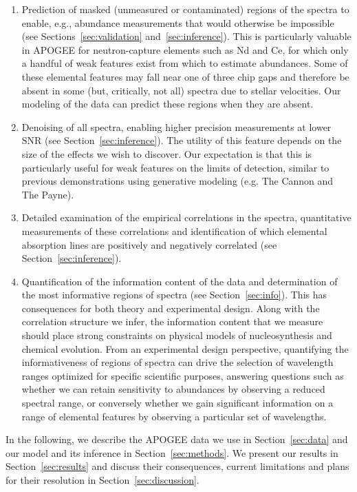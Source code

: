 \documentclass[a4paper,fleqn,usenatbib]{mnras}
\begin{document}
\begin{enumerate}
\item Prediction of masked (unmeasured or contaminated) regions of the spectra to enable, e.g., abundance measurements that would otherwise be impossible (see Sections~\ref{sec:validation} and~\ref{sec:inference}). This is particularly valuable in APOGEE for neutron-capture elements such as Nd and Ce, for which only a handful of weak features exist from which to estimate abundances. Some of these elemental features may fall near one of three chip gaps and therefore be absent in some (but, critically, not all) spectra due to stellar velocities. Our modeling of the data can predict these regions when they are absent. 
\item Denoising of all spectra, enabling higher precision measurements at lower SNR (see Section~\ref{sec:inference}). The utility of this feature depends on the size of the effects we wish to discover. Our expectation is that this is particularly useful for weak features on the limits of detection, similar to previous demonstrations using generative modeling (e.g. The Cannon and The Payne).
\item Detailed examination of the empirical correlations in the spectra, quantitative measurements of these correlations and identification of which elemental absorption lines are positively and negatively correlated (see Section~\ref{sec:inference}).
\item Quantification of the information content of the data and determination of the most informative regions of spectra (see Section~\ref{sec:info}). This has consequences for both theory and experimental design. Along with the correlation structure we infer, the information content that we measure should place strong constraints on physical models of nucleosynthesis and chemical evolution. From an experimental design perspective, quantifying the informativeness of regions of spectra can drive the selection of wavelength ranges optimized for specific scientific purposes, answering questions such as whether we can retain sensitivity to abundances by observing a reduced spectral range, or conversely whether we gain significant information on a range of elemental features by observing a particular set of wavelengths.
\end{enumerate}

In the following, we describe the APOGEE data we use in Section~\ref{sec:data} and our model and its inference in Section~\ref{sec:methods}. We present our results in Section~\ref{sec:results} and discuss their consequences, current limitations and plans for their resolution in Section~\ref{sec:discussion}.
\end{document}
